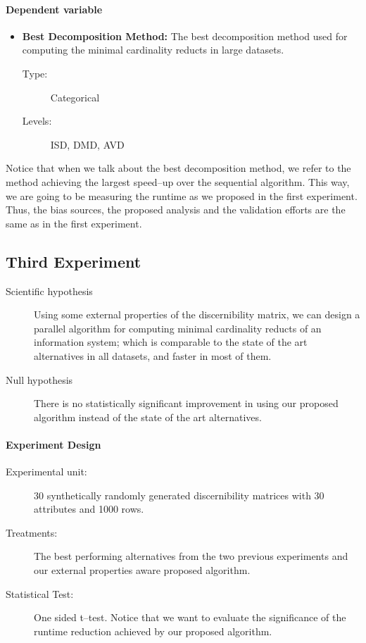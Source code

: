 \documentclass[11pt]{article}   %
\begin{document}
    \paragraph{Dependent variable}  
  	\begin{itemize}
  	   \item \textbf{Best Decomposition Method:} The best decomposition method used for computing the minimal
  	   											cardinality	reducts in large datasets.
  	   		\begin{description}
  	   			\item[Type:] Categorical
  	   			\item[Levels:] ISD, DMD, AVD
  	   		\end{description}
    \end{itemize}
    
    Notice that when we talk about the best decomposition method, we refer to the method achieving the largest
    speed--up over the sequential algorithm. This way, we are going to be measuring the runtime as we proposed 
    in the first experiment. Thus, the bias sources, the proposed analysis and the validation efforts are the 
    same as in the first experiment.

\subsection{Third Experiment}\label{exprimet3}
  \begin{description}
  \item[Scientific hypothesis] Using some external properties of the discernibility matrix, we can design a
  							   parallel algorithm for computing minimal cardinality reducts of an information
  							   system; which is comparable to the state of the art alternatives in all datasets,
  							   and faster in most of them.
  \item[Null hypothesis] There is no statistically significant improvement in using our proposed
  						 algorithm instead of the state of the art alternatives.
  \end{description}
  \paragraph{Experiment Design} 
	  \begin{description}
	  	\item[Experimental unit:] 30 synthetically randomly generated discernibility matrices with 30 attributes
	  							  and 1000 rows.
	  	\item[Treatments:] The best performing alternatives from the two previous experiments and our external 
	  					   properties aware proposed algorithm.
	  	\item[Statistical Test:] One sided t--test. Notice that we want to evaluate the significance of the
	  							 runtime reduction achieved by our proposed algorithm.
	  \end{description}
\end{document}
